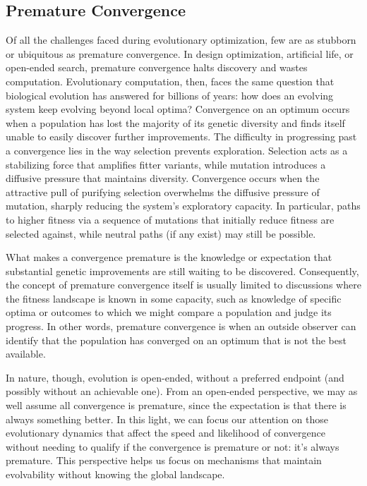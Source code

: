 \subsection{Premature Convergence}
Of all the challenges faced during evolutionary optimization, few are as stubborn or ubiquitous as premature convergence.
In design optimization, artificial life, or open-ended search, premature convergence halts discovery and wastes computation.
Evolutionary computation, then, faces the same question that biological evolution has answered for billions of years: how does an evolving system keep evolving beyond local optima?
Convergence on an optimum occurs when a population has lost the majority of its genetic diversity and finds itself unable to easily discover further improvements.
The difficulty in progressing past a convergence lies in the way selection prevents exploration.
Selection acts as a stabilizing force that amplifies fitter variants, while mutation introduces a diffusive pressure that maintains diversity.
Convergence occurs when the attractive pull of purifying selection overwhelms the diffusive pressure of mutation, sharply reducing the system's exploratory capacity.
In particular, paths to higher fitness via a sequence of mutations that initially reduce fitness are selected against, while neutral paths (if any exist) may still be possible.

What makes a convergence premature is the knowledge or expectation that substantial genetic improvements are still waiting to be discovered.
Consequently, the concept of premature convergence itself is usually limited to discussions where the fitness landscape is known in some capacity, such as knowledge of specific optima or outcomes to which we might compare a population and judge its progress.
In other words, premature convergence is when an outside observer can identify that the population has converged on an optimum that is not the best available.

In nature, though, evolution is open-ended, without a preferred endpoint (and possibly without an achievable one).
From an open-ended perspective, we may as well assume all convergence is premature, since the expectation is that there is always something better.
In this light, we can focus our attention on those evolutionary dynamics that affect the speed and likelihood of convergence without needing to qualify if the convergence is premature or not: it's always premature.
This perspective helps us focus on mechanisms that maintain evolvability without knowing the global landscape.

